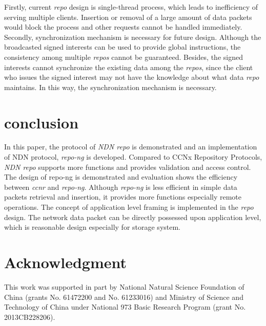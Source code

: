 \documentclass[conference]{IEEEtran}
\begin{document}
Firstly, current \emph{repo} design is single-thread process, which leads to inefficiency of serving multiple clients. Insertion or removal of a large amount of data packets would block the process and other requests cannot be handled immediately. Secondly, synchronization mechanism is necessary for future design. Although the broadcasted signed interests can be used to provide global instructions, the consistency among multiple \emph{repos} cannot be guaranteed. Besides, the signed interests cannot synchronize the existing data among the \emph{repos}, since the client who issues the signed interest may not have the knowledge about what data \emph{repo} maintains. In this way, the synchronization mechanism is necessary.

\section{conclusion} \label{section-conclusion}
In this paper, the protocol of \emph{NDN repo} is demonstrated and an implementation of NDN protocol, \emph{repo-ng} is developed. Compared to CCNx Repository Protocols, \emph{NDN repo} supports more functions and provides validation and access control. The design of repo-ng is demonstrated and evaluation shows the efficiency between \emph{ccnr} and \emph{repo-ng}. Although \emph{repo-ng} is less efficient in simple data packets retrieval and insertion, it provides more functions especially remote operations. The concept of application level framing is implemented in the \emph{repo} design. The network data packet can be directly possessed upon application level, which is reasonable design especially for storage system.

\section*{Acknowledgment}
This work was supported in part by National Natural Science Foundation of China (grants No. 61472200 and No. 61233016) and Ministry of Science and Technology of China under National 973 Basic Research Program (grant No. 2013CB228206).



\end{document}
